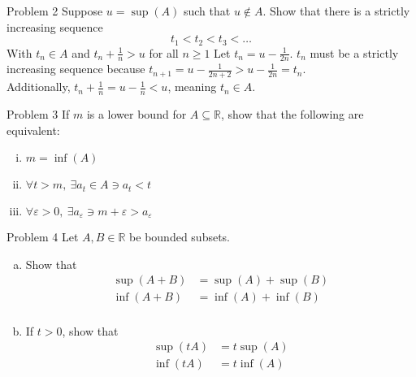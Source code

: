 \documentclass[8pt]{extarticle}
\newcommand{\R}{\mathbb{R}}
\begin{document}
  \begin{problem}{Problem 2}
    Suppose $u = \sup(A)$ such that $u\notin A$. Show that there is a strictly increasing sequence
    \[
      t_1 < t_2 < t_3 < \dots
    \] 
    With $t_n \in A$ and $t_n + \frac{1}{n} > u$ for all $n \geq 1$
    \tcblower
    Let $t_n = u-\frac{1}{2n}$. $t_n$ must be a strictly increasing sequence because $t_{n+1} = u - \frac{1}{2n+2} > u-\frac{1}{2n} = t_n$.\\

    Additionally, $t_n + \frac{1}{n} = u-\frac{1}{n} < u$, meaning $t_n\in A$.
  \end{problem}
  \begin{problem}{Problem 3}
    If $m$ is a lower bound for $A\subseteq \R$, show that the following are equivalent:
    \begin{enumerate}[(i)]
      \item $m = \inf(A)$
      \item $\forall t > m,~\exists a_t\in A \ni a_t < t$
      \item $\forall \varepsilon > 0,~\exists a_{\varepsilon} \ni m+\varepsilon > a_{\varepsilon}$
    \end{enumerate}
  \end{problem}
  \begin{problem}{Problem 4}
    Let $A,B\in\R$ be bounded subsets.
    \begin{enumerate}[(a)]
      \item Show that
        \begin{align*}
          \sup(A+B) &= \sup(A) + \sup(B)\\
          \inf(A+B) &= \inf(A) + \inf(B)\\
        \end{align*}
      \item If $t > 0$, show that
        \begin{align*}
          \sup(tA) &= t\sup(A)\\
          \inf(tA) &= t\inf(A)
        \end{align*}
    \end{enumerate}
  \end{problem}
\end{document}
